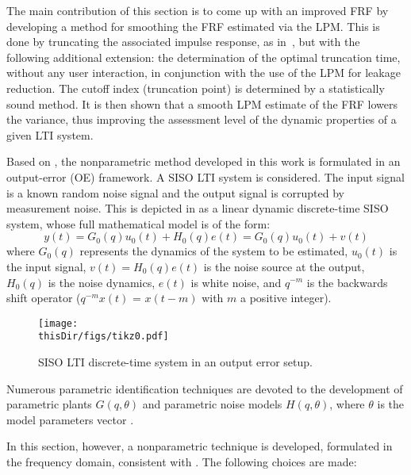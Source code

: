 The main contribution of this section is to come up with an improved \gls{FRF} by developing a method for smoothing the \gls{FRF} estimated via the LPM. This is done by truncating the associated impulse response, as in~\citep{Schoukens1998}, but with the following additional extension: the determination of the optimal truncation time, without any user interaction, in conjunction with the use of the \gls{LPM} for leakage reduction. The cutoff index (truncation point) is determined by a statistically sound method. It is then shown that a smooth \gls{LPM} estimate of the \gls{FRF} lowers the variance, thus improving the assessment level of the dynamic properties of a given LTI system.

Based on \citep{Schoukens2009LPM}, the nonparametric method developed in this work is formulated in an output-error (OE) framework. A \gls{SISO} \gls{LTI} system is considered. %
The input signal is a known random noise signal and the output signal is corrupted by measurement noise. This is depicted in  as a linear dynamic discrete-time \gls{SISO} system, whose full mathematical model is of the form:
\begin{equation}\label{eq:lpm:TD}
y(t)=G_0(q)u_0(t)+H_0(q)e(t)=G_0(q)u_0(t)+v(t)
\end{equation}
where $G_0(q)$ represents the dynamics of the system to be estimated, $u_0(t)$ is the input signal, $v(t)= H_0(q)e(t)$ is the noise source at the output, $H_0(q)$ is the noise dynamics, $e(t)$ is white noise, and $q^{-m}$ is the backwards shift operator ($q^{-m}x(t)$ = $x(t-m)$  with $m$ a positive integer). %

\begin{figure}[tbh] %
\centering
\texttt{[image: \\thisDir/figs/tikz0.pdf]}
\caption{SISO LTI discrete-time system in an output error setup.}
\label{lpmtdrep}
\end{figure}

Numerous parametric identification techniques are devoted to the development of parametric plants $G(q,\theta)$ and parametric noise models  $H(q,\theta)$, where  $\theta$ is the model parameters vector  \citep{Ljung1999,Soderstrom1989}.

In this section, however, a nonparametric technique is developed, %
formulated in the frequency domain, consistent with \citep{Pintelon2012,Mahata2006}. The following  choices are made:

